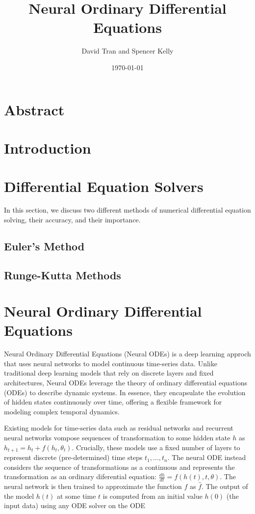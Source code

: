 \documentclass[11pt]{article}
\title{Neural Ordinary Differential Equations}
\author{David Tran and Spencer Kelly}
\date{\today}
\begin{document}
\maketitle

\section*{Abstract}

\section{Introduction}

\section{Differential Equation Solvers}

In this section, we discuss two different methods of numerical differential equation solving, their accuracy, and their importance.

\subsection{Euler's Method}

\subsection{Runge-Kutta Methods}

\section{Neural Ordinary Differential Equations}

Neural Ordinary Differential Equations (Neural ODEs) is a deep learning approch that uses neural networks to model continuous time-series data. Unlike traditional deep learning models that rely on discrete layers and fixed architectures, Neural ODEs leverage the theory of ordinary differential equations (ODEs) to describe dynamic systems. In essence, they encapsulate the evolution of hidden states continuously over time, offering a flexible framework for modeling complex temporal dynamics.

Existing models for time-series data such as residual networks and recurrent neural networks vompose sequences of transformation to some hidden state $h$ as $h_{t + 1} = h_t + f(h_t, \theta_t)$. Crucially, these models use a fixed number of layers to represent discrete (pre-determined) time steps $t_1, \dots, t_n$. The neural ODE instead considers the sequence of transformations as a continuous and represents the transformation as an ordinary diferential equation: $\frac{dh}{dt} = f(h(t), t, \theta)$. The neural network is then trained to approximate the function $f$ as $\hat f$. The output of the model $h(t)$ at some time $t$ is computed from an initial value $h(0)$ (the input data) using any ODE solver on the ODE
\end{document}

